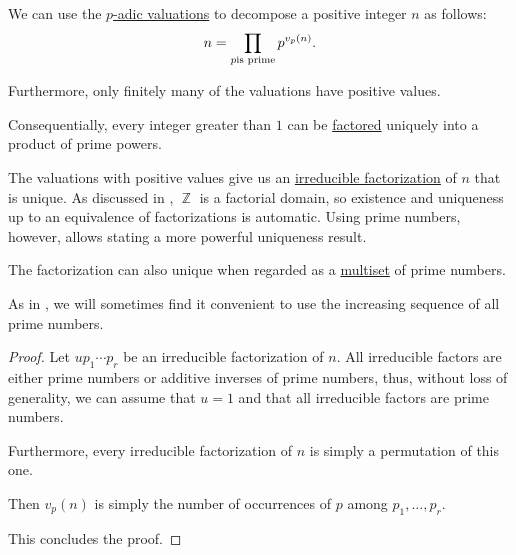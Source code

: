 \begin{theorem}\label{thm:fundamental_theorem_of_arithmetic}
  We can use the \hyperref[def:padic_valuation]{\( p \)-adic valuations} to decompose a positive integer \( n \) as follows:
  \begin{equation}\label{eq:thm:fundamental_theorem_of_arithmetic}
    n = \prod_{p \T{is prime}} p^{v_p(n)}.
  \end{equation}

  Furthermore, only finitely many of the valuations have positive values.
\end{theorem}
\begin{comments}
  \item Consequentially, every integer greater than \( 1 \) can be \hyperref[def:irreducible_factorization]{factored} uniquely into a product of prime powers.

  \item The valuations with positive values give us an \hyperref[def:irreducible_factorization]{irreducible factorization} of \( n \) that is unique. As discussed in , \( \BbbZ \) is a factorial domain, so existence and uniqueness up to an equivalence of factorizations is automatic. Using prime numbers, however, allows stating a more powerful uniqueness result.

  \item The factorization can also unique when regarded as a \hyperref[def:multiset]{multiset} of prime numbers.

  \item As in \cite[18]{Apostol1976AnalyticNumberTheory}, we will sometimes find it convenient to use the increasing sequence of all prime numbers.
\end{comments}
\begin{proof}
  Let \( u p_1 \cdots p_r \) be an irreducible factorization of \( n \). All irreducible factors are either prime numbers or additive inverses of prime numbers, thus, without loss of generality, we can assume that \( u = 1 \) and that all irreducible factors are prime numbers.

  Furthermore, every irreducible factorization of \( n \) is simply a permutation of this one.

  Then \( v_p(n) \) is simply the number of occurrences of \( p \) among \( p_1, \ldots, p_r \).

  This concludes the proof.
\end{proof}

